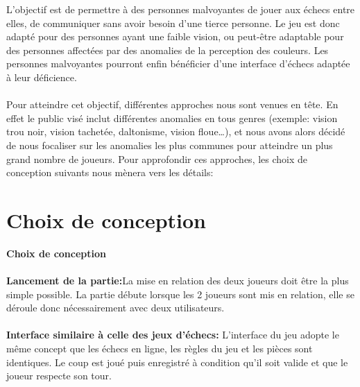 \documentclass[12pt, openany]{report}
\begin{document}
L’objectif est de permettre à des personnes malvoyantes de jouer aux échecs entre elles, de communiquer sans avoir besoin d’une tierce personne.\newline
Le jeu est donc adapté pour des personnes ayant une faible vision, ou peut-être adaptable pour des personnes affectées par des anomalies de la perception des couleurs.\newline
Les personnes malvoyantes pourront enfin bénéficier d'une interface d'échecs adaptée à leur déficience.

\paragraph{}
Pour atteindre cet objectif, différentes approches nous sont venues en tête. \newline 
En effet le public visé inclut différentes anomalies en tous genres (exemple: vision trou noir, vision tachetée, daltonisme, vision floue…), et nous avons alors décidé de nous focaliser sur les anomalies les plus communes pour atteindre un plus grand nombre de joueurs.
\newline Pour approfondir ces approches, les choix de conception suivants nous mènera vers les détails: 
\newline\newline

\section{Choix de conception}

\textbf{Choix de conception}
\paragraph{}
\textbf{Lancement de la partie:}\newline La mise en relation des deux joueurs doit être la plus simple possible. \newline
La partie débute lorsque les 2 joueurs sont mis en relation, elle se déroule donc nécessairement avec deux utilisateurs.
\paragraph{}
\textbf{Interface similaire à celle des jeux d'échecs:} \newline
L’interface du jeu adopte le même concept que les échecs en ligne, les règles du jeu et les pièces  sont identiques. Le coup est joué puis enregistré à condition qu'il soit valide et que le joueur respecte son tour.
\end{document}
